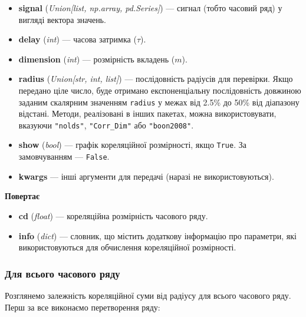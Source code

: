 \documentclass[
  letterpaper,
]{report}
\providecommand{\tightlist}{%
  \setlength{\itemsep}{0pt}\setlength{\parskip}{0pt}}\usepackage{longtable,booktabs,array}
\begin{document}
\begin{itemize}
\tightlist
\item
  \textbf{signal} (\emph{Union{[}list, np.array, pd.Series{]}}) ---
  сигнал (тобто часовий ряд) у вигляді вектора значень.
\item
  \textbf{delay} (\emph{int}) --- часова затримка (\(\tau\)).
\item
  \textbf{dimension} (\emph{int}) --- розмірність вкладень (\(m\)).
\item
  \textbf{radius} (\emph{Union{[}str, int, list{]}}) --- послідовність
  радіусів для перевірки. Якщо передано ціле число, буде отримано
  експоненціальну послідовність довжиною заданим скалярним значенням
  \texttt{radius} у межах від 2.5\% до 50\% від діапазону відстані.
  Методи, реалізовані в інших пакетах, можна використовувати, вказуючи
  \texttt{"nolds"}, \texttt{"Corr\_Dim"} або \texttt{"boon2008"}.
\item
  \textbf{show} (\emph{bool}) --- графік кореляційної розмірності, якщо
  \texttt{True}. За замовчуванням --- \texttt{False}.
\item
  \textbf{kwargs} --- інші аргументи для передачі (наразі не
  використовуються).
\end{itemize}

\textbf{Повертає}

\begin{itemize}
\tightlist
\item
  \textbf{cd} (\emph{float}) --- кореляційна розмірність часового ряду.
\item
  \textbf{info} (\emph{dict}) --- словник, що містить додаткову
  інформацію про параметри, які використовуються для обчислення
  кореляційної розмірності.
\end{itemize}

\hypertarget{ux434ux43bux44f-ux432ux441ux44cux43eux433ux43e-ux447ux430ux441ux43eux432ux43eux433ux43e-ux440ux44fux434ux443}{%
\subsubsection{Для всього часового
ряду}\label{ux434ux43bux44f-ux432ux441ux44cux43eux433ux43e-ux447ux430ux441ux43eux432ux43eux433ux43e-ux440ux44fux434ux443}}

Розглянемо залежність кореляційної суми від радіусу для всього часового
ряду. Перш за все виконаємо перетворення ряду:
\end{document}
